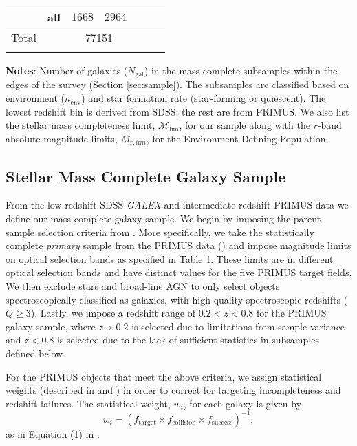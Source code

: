 \documentclass{aastex}
\begin{document}
\begin{table*}
\begin{center}
\begin{tabular}{ccccccc}
               & all              & $1668$                      & $2964$                          \\ \hline
Total &      & \multicolumn{2}{c}{77151} & \\ \hline
  \multicolumn{4}{l}{}                                             \\       
    \end{tabular} \par
    \end{center}
    {\bf Notes}: Number of galaxies ($N_{\mathrm{gal}}$) in the mass complete subsamples within the edges of the survey (Section \ref{sec:sample}). The subsamples are classified based on environment ($n_{\mathrm{env}}$) and star formation rate (star-forming or quiescent). The lowest redshift bin is derived from SDSS; the rest are from PRIMUS. We also list the stellar mass completeness limit, $\mathcal{M}_{\mathrm{lim}}$, for our sample along with the $r$-band absolute magnitude limits, $M_{\mathrm{r}, lim}$, for the Environment Defining Population. 
    \bigskip
\end{table*}

\subsection{Stellar Mass Complete Galaxy Sample} \label{sec:target} 
From the low redshift SDSS-{\em GALEX} and intermediate redshift
PRIMUS data we define our mass complete galaxy
sample. We begin by imposing the parent sample selection criteria from
\cite{Moustakas:2013aa}. More specifically, we take the statistically
complete {\em primary} sample from the PRIMUS data
(\citealt{Coil:2011aa}) and impose magnitude limits on optical
selection bands as specified in \cite{Moustakas:2013aa} Table 1. These
limits are in different optical selection bands and have distinct
values for the five PRIMUS target fields. We then exclude stars and
broad-line AGN to only select objects spectroscopically classified as
galaxies, with high-quality spectroscopic redshifts ($Q \geq
3$). Lastly, we impose a redshift range of $ 0.2 < z < 0.8$ for the
PRIMUS galaxy sample, where $ z > 0.2$ is selected due to limitations
from sample variance and $ z < 0.8$ is selected due to the lack of
sufficient statistics in subsamples defined below.

For the PRIMUS objects that meet the above criteria, we assign statistical weights (described in \citealt{Coil:2011aa} and \citealt{Cool:2013aa}) in order to correct for targeting incompleteness and redshift failures. The statistical weight, $w_i$, for each galaxy is given by
\begin{equation}
w_{i} = (f_{\mathrm{target}} \times f_{\mathrm{collision}} \times f_{\mathrm{success}})^{-1},
\end{equation}
as in Equation (1) in \cite{Moustakas:2013aa}. 
\end{document}
